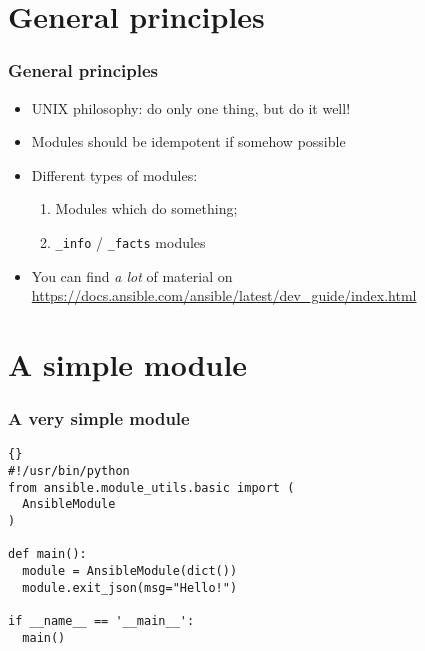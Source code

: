 \documentclass{beamer}
\begin{document}
  \section{General principles}
  \begin{frame}
    \frametitle{General principles}
    \begin{itemize}
      \item UNIX philosophy: do only one thing, but do it well!
      \item<2-> Modules should be idempotent if somehow possible
      \item<3-> Different types of modules:
      \begin{enumerate}
        \item Modules which do something;
        \item \lstinline|_info| / \lstinline|_facts| modules
      \end{enumerate}
      \item<4-> You can find \emph{a lot} of material on \url{https://docs.ansible.com/ansible/latest/dev_guide/index.html}
    \end{itemize}
  \end{frame}

  \section{A simple module}

  \begin{frame}[fragile]
    \frametitle{A very simple module}
\begin{lstlisting}{}
#!/usr/bin/python
from ansible.module_utils.basic import (
  AnsibleModule
)

def main():
  module = AnsibleModule(dict())
  module.exit_json(msg="Hello!")

if __name__ == '__main__':
  main()
\end{lstlisting}
  \end{frame}
\end{document}
